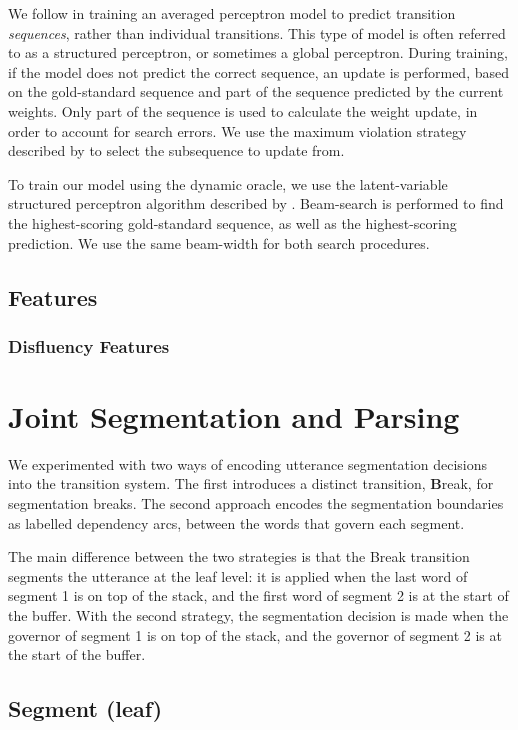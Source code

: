 \documentclass[11pt,letterpaper]{article}
\begin{document}
We follow \citet{collins:02} in training an averaged perceptron model to predict
transition \emph{sequences}, rather than individual transitions.  This type of model
is often referred to as a structured perceptron, or sometimes a global perceptron.
During training, if the model does not predict the correct sequence, an update
is performed, based on the gold-standard sequence and part of the sequence predicted
by the current weights.
Only part of the sequence is used to calculate the weight update, in order to
account for search errors. We use the maximum violation strategy described by
\citet{huang:12} to select the subsequence to update from.

To train our model using the dynamic oracle, we use the latent-variable structured
perceptron algorithm described by \citet{sun:09}.
Beam-search is performed to find the highest-scoring gold-standard
sequence, as well as the highest-scoring prediction. We use the same beam-width for both
search procedures.
\subsection{Features}

\subsubsection{Disfluency Features}

\clearpage

\section{Joint Segmentation and Parsing}

We experimented with two ways of encoding utterance segmentation decisions into
the transition system.  The first introduces a distinct transition,
\textbf{B}reak, for segmentation breaks.
The second approach encodes the segmentation boundaries as 
labelled dependency arcs, between the words that govern each segment.

The main difference between the two strategies is that the Break transition
segments the utterance at the leaf level: it is applied when the last word
of segment 1 is on top of the stack, and the first word of segment 2 is at the
start of the buffer.  With the second strategy, the segmentation decision is
made when the governor of segment 1 is on top of the stack, and the governor
of segment 2 is at the start of the buffer.

\subsection{Segment (leaf)}
\end{document}
